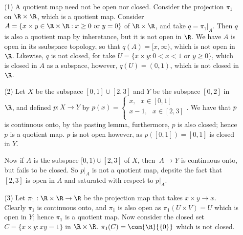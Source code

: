 \begin{example}
    \begin{enumerate}
        \item[(1)] A quotient map need not be open nor closed. Consider the
            projection $\pi_1$ on $\R \times \R$, which is a quotient map.
            Consider $A=\{x \times y \in \R \times \R : x \geq 0 \text{ or }
            y=0\}$ of $\R \times \R$, and take $q=\pi_1|_{A}$. Then $q$ is also
            a quotient map by inheretance, but it is not open in  $\R$. We have
             $A$ is open in its ssubspace topology, so that  $q(A)=[x, \infty)$,
             which is not open in $\R$. Likewise, $q$ is not closed, for take
             $U=\{x \times y: 0<x<1 \text{ or } y \geq 0\}$, which is closed in
             $A$ as a subspace, however,  $q(U)=(0,1)$, which is not closed in
             $\R$.

        \item[(2)] Let $X$ be the subspace  $[0,1] \cup [2,3]$ and $Y$ be the subspace  $[0,2]$ in $\R$,
            and defined  $p:X \rightarrow Y$ by  $p(x)=\begin{cases}
                                                x, \text{ } x \in [0,1] \\
                                                x-1, \text{ } x \in [2,3] \\
                                            \end{cases}$.
        We have that $p$ is continuous onto, by the pasting lemma, furthermore,  $p$ is also closed;
        hence  $p$ is a quotient map.  $p$ is not open however, as  $p([0,1])=[0,1]$ is closed in
        $Y$.

        Now if  $A$ is the subspace  $[0,1) \cup [2,3]$ of $X$, then  $\:A \rightarrow Y$ is
        continuous onto, but fails to be closed. So  $p|_A$ is not a quotient map, depsite the fact
        that  $[2,3]$ is open in $A$ and saturated with respect to  $p|_A$.

        \item[(3)] Let $\pi_1:\R \times \R \rightarrow \R$ be the projection map that takes $x \times y
            \rightarrow x$. Clearly  $\pi_1$ is continuous onto, and $\pi_1$ is also open as
            $\pi_1(U \times V)=U$ which is open in $Y$; hence  $\pi_1$ is a quotient map. Now
            consider the closed set $C=\{x \times y:xy=1\}$ in $\R \times \R$.
            $\pi_1(C)=\com{\R}{\{0\}}$ which is not closed.
    \end{enumerate}
\end{example}

